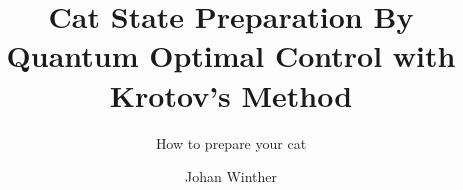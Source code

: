 \documentclass[masters,university,a4paper]{chalmers-thesis}
\title{Cat State Preparation By Quantum Optimal Control with Krotov's Method}
\subtitle{How to prepare your cat} %
\author{Johan Winther}
\begin{document}
\maketitle

%







\nocite{*} %
\printbibliography %
\end{document}
